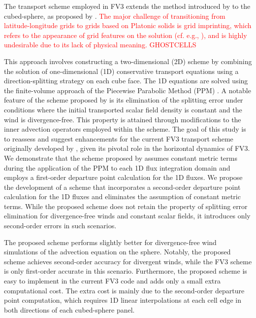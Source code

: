 \documentclass[preprint,12pt]{elsarticle}
\begin{document}
\begin{linenumbers}
The transport scheme employed in FV3 extends the method introduced by \cite{lin:1996} to the cubed-sphere, as proposed by \cite{putman:2007}. 
\textcolor{red}{
	The major challenge of transitioning from latitude-longitude grids to grids based on Platonic solids \cite{stan:2012} is grid imprinting, which refers to the appearance of grid features on the solution (cf. e.g., \cite{peixoto:2013, weller:2012, mouallem:2023}), and is highly undesirable due to its lack of physical meaning.
GHOSTCELLS}

This approach involves constructing a two-dimensional (2D) scheme by combining the solution of one-dimensional (1D) conservative transport equations using a direction-splitting strategy on each cube face.
The 1D equations are solved using the finite-volume approach of the Piecewise Parabolic Method (PPM) \cite{colella:1984,carpenter:1990}. 
A notable feature of the scheme proposed by \cite{lin:1996} is its elimination of the splitting error under conditions where the initial transported scalar field density is constant and the wind is divergence-free. 
This property is attained through modifications to the inner advection operators employed within the scheme. 
The goal of this study is to reassess and suggest enhancements for the current FV3 transport scheme originally developed by \cite{putman:2007}, given its pivotal role in the horizontal dynamics of FV3. 
We demonstrate that the scheme proposed by \cite{putman:2007} assumes constant metric terms during the application of the PPM to each 1D flux integration domain and employs a first-order departure point calculation for the 1D fluxes.
We propose the development of a scheme that incorporates a second-order departure point calculation for the 1D fluxes and eliminates the assumption of constant metric terms. 
While the proposed scheme does not retain the property of splitting error elimination for divergence-free winds and constant scalar fields, it introduces only second-order errors in such scenarios.

The proposed scheme performs slightly better for divergence-free wind simulations of the advection equation on the sphere.
Notably, the proposed scheme achieves second-order accuracy for divergent winds, while the FV3 scheme is only first-order accurate in this scenario.
Furthermore,  the proposed scheme is easy to implement in the current FV3 code and adds only a small extra computational cost.
The extra cost is mainly due to the second-order departure point computation, which requires 1D linear interpolations at each cell edge in both directions of each cubed-sphere panel.


\end{linenumbers}
\end{document}
